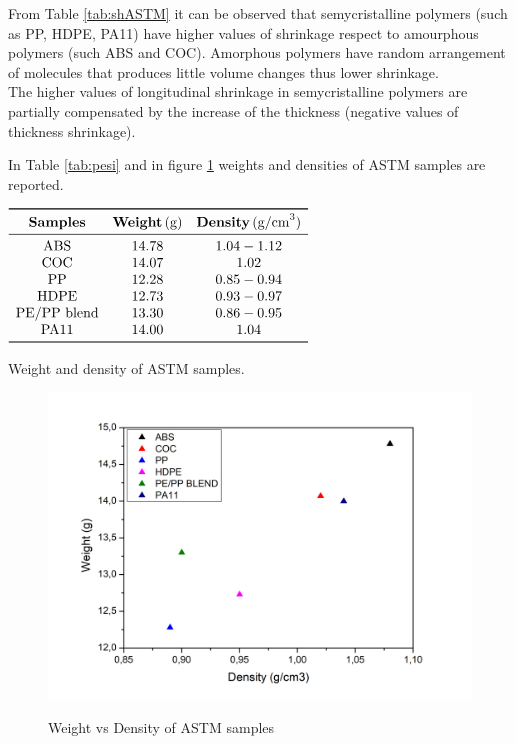 \documentclass[a4paper, 11pt]{article}
\begin{document}
From Table \ref{tab:shASTM} it can be observed that semycristalline polymers (such as PP, HDPE, PA11) have higher values of shrinkage respect to amourphous polymers (such ABS and COC). Amorphous polymers have random arrangement of molecules that produces little volume changes thus lower shrinkage. \\
The higher values of longitudinal shrinkage in semycristalline polymers are partially compensated by the increase of the thickness (negative values of thickness shrinkage).

In Table \ref{tab:pesi} and in figure \ref{fig:Graph1} weights and densities of ASTM samples are reported.

\begin{table}[htp]
\centering
$
\begin{array}{ccc}
\toprule
\textbf{Samples} & \textbf{Weight}\,(\text{g}) & \textbf{Density}\,(\text{g/cm}^3) \\
\midrule
\text{ABS} & 14.78 & 1.04-1.12  \\
\text{COC} & 14.07 & 1.02 \\
\text{PP} & 12.28 & 0.85-0.94 \\
\text{HDPE} & 12.73 & 0.93-0.97 \\
\text{PE/PP blend} & 13.30 & 0.86-0.95 \\
\text{PA11} & 14.00 & 1.04 \\
\bottomrule
\end{array}
$
\caption{Weight and density of ASTM samples.}
\label{tab:pesi}
\end{table}

\begin{figure}[htp]
	\centering
	\includegraphics[scale=0.3]
	{Graph1}
	\label{fig:Graph1}
	\caption{Weight vs Density of ASTM samples}
\end{figure}
\end{document}
